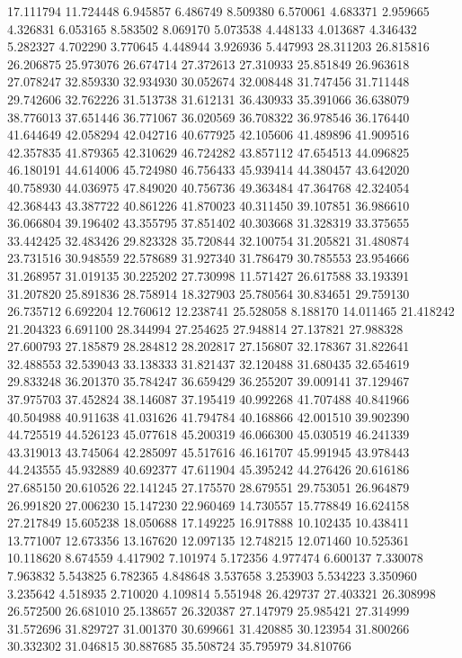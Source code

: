 17.111794
11.724448
6.945857
6.486749
8.509380
6.570061
4.683371
2.959665
4.326831
6.053165
8.583502
8.069170
5.073538
4.448133
4.013687
4.346432
5.282327
4.702290
3.770645
4.448944
3.926936
5.447993
28.311203
26.815816
26.206875
25.973076
26.674714
27.372613
27.310933
25.851849
26.963618
27.078247
32.859330
32.934930
30.052674
32.008448
31.747456
31.711448
29.742606
32.762226
31.513738
31.612131
36.430933
35.391066
36.638079
38.776013
37.651446
36.771067
36.020569
36.708322
36.978546
36.176440
41.644649
42.058294
42.042716
40.677925
42.105606
41.489896
41.909516
42.357835
41.879365
42.310629
46.724282
43.857112
47.654513
44.096825
46.180191
44.614006
45.724980
46.756433
45.939414
44.380457
43.642020
40.758930
44.036975
47.849020
40.756736
49.363484
47.364768
42.324054
42.368443
43.387722
40.861226
41.870023
40.311450
39.107851
36.986610
36.066804
39.196402
43.355795
37.851402
40.303668
31.328319
33.375655
33.442425
32.483426
29.823328
35.720844
32.100754
31.205821
31.480874
23.731516
30.948559
22.578689
31.927340
31.786479
30.785553
23.954666
31.268957
31.019135
30.225202
27.730998
11.571427
26.617588
33.193391
31.207820
25.891836
28.758914
18.327903
25.780564
30.834651
29.759130
26.735712
6.692204
12.760612
12.238741
25.528058
8.188170
14.011465
21.418242
21.204323
6.691100
28.344994
27.254625
27.948814
27.137821
27.988328
27.600793
27.185879
28.284812
28.202817
27.156807
32.178367
31.822641
32.488553
32.539043
33.138333
31.821437
32.120488
31.680435
32.654619
29.833248
36.201370
35.784247
36.659429
36.255207
39.009141
37.129467
37.975703
37.452824
38.146087
37.195419
40.992268
41.707488
40.841966
40.504988
40.911638
41.031626
41.794784
40.168866
42.001510
39.902390
44.725519
44.526123
45.077618
45.200319
46.066300
45.030519
46.241339
43.319013
43.745064
42.285097
45.517616
46.161707
45.991945
43.978443
44.243555
45.932889
40.692377
47.611904
45.395242
44.276426
20.616186
27.685150
20.610526
22.141245
27.175570
28.679551
29.753051
26.964879
26.991820
27.006230
15.147230
22.960469
14.730557
15.778849
16.624158
27.217849
15.605238
18.050688
17.149225
16.917888
10.102435
10.438411
13.771007
12.673356
13.167620
12.097135
12.748215
12.071460
10.525361
10.118620
8.674559
4.417902
7.101974
5.172356
4.977474
6.600137
7.330078
7.963832
5.543825
6.782365
4.848648
3.537658
3.253903
5.534223
3.350960
3.235642
4.518935
2.710020
4.109814
5.551948
26.429737
27.403321
26.308998
26.572500
26.681010
25.138657
26.320387
27.147979
25.985421
27.314999
31.572696
31.829727
31.001370
30.699661
31.420885
30.123954
31.800266
30.332302
31.046815
30.887685
35.508724
35.795979
34.810766
